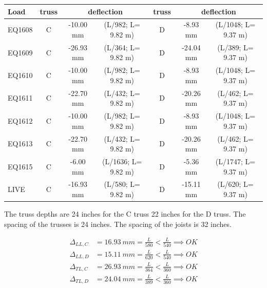 \begin{center}
  \begin{scriptsize}
  \begin{tabular}{|l|c|c|c|c|c|c|}
    \hline
    \textbf{Load} & \textbf{truss} & \multicolumn{2}{c|}{\textbf{deflection}} & \textbf{truss} & \multicolumn{2}{c|}{\textbf{deflection}} \\
    \hline
EQ1608 & C & -10.00 mm & (L/982; L= 9.82 m) & D & -8.93 mm & (L/1048; L= 9.37 m) \\
EQ1609 & C & -26.93 mm & (L/364; L= 9.82 m) & D & -24.04 mm & (L/389; L= 9.37 m) \\
EQ1610 & C & -10.00 mm & (L/982; L= 9.82 m) & D & -8.93 mm & (L/1048; L= 9.37 m) \\
EQ1611 & C & -22.70 mm & (L/432; L= 9.82 m) & D & -20.26 mm & (L/462; L= 9.37 m) \\
EQ1612 & C & -10.00 mm & (L/982; L= 9.82 m) & D & -8.93 mm & (L/1048; L= 9.37 m) \\
EQ1613 & C & -22.70 mm & (L/432; L= 9.82 m) & D & -20.26 mm & (L/462; L= 9.37 m) \\
EQ1615 & C & -6.00 mm & (L/1636; L= 9.82 m) & D & -5.36 mm & (L/1747; L= 9.37 m) \\
LIVE & C & -16.93 mm & (L/580; L= 9.82 m) & D & -15.11 mm & (L/620; L= 9.37 m) \\
\hline
  \end{tabular}
  \end{scriptsize}
\end{center}

\noindent The truss depths are 24 inches for the C truss 22 inches for the D truss. The spacing of the trusses is 24 inches. The spacing of the joists is 32 inches. 

\begin{align}
\Delta_{LL,C} &= 16.93\ mm= \frac{L}{580} < \frac{L}{540} \implies OK \\
\Delta_{LL,D} &= 15.11\ mm= \frac{L}{620} < \frac{L}{540} \implies OK \\
\Delta_{TL,C} &= 26.93\ mm= \frac{L}{364} < \frac{L}{360} \implies OK \\
\Delta_{TL,D} &= 24.04\ mm= \frac{L}{389} < \frac{L}{360} \implies OK
\end{align}

